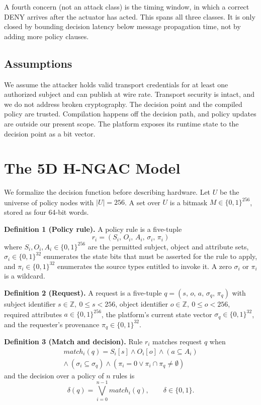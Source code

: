 \documentclass[conference]{IEEEtran}
\begin{document}
A fourth concern (not an attack class) is the timing window, in which a correct DENY arrives after the actuator has acted. This spans all three classes. It is only closed by bounding decision latency below message propagation time, not by adding more policy clauses. %

\subsection{Assumptions}

We assume the attacker holds valid transport credentials for at least one authorized subject and can publish at wire rate. Transport security is intact, and we do not address broken cryptography. The decision point and the compiled policy are trusted. Compilation happens off the decision path, and policy updates are outside our present scope. The platform exposes its runtime state to the decision point as a bit vector.

\section{The 5D H-NGAC Model}
\label{sec:model}

We formalize the decision function before describing hardware. Let $U$ be the universe of policy nodes with $|U| = 256$. A set over $U$ is a bitmask $M \in \{0,1\}^{256}$, stored as four 64-bit words.

\textbf{Definition 1 (Policy rule).} A policy rule is a five-tuple
\begin{equation}
r_i = (S_i,\, O_i,\, A_i,\, \sigma_i,\, \pi_i)
\label{eq:rule}
\end{equation}
where $S_i, O_i, A_i \in \{0,1\}^{256}$ are the permitted subject, object and attribute sets, $\sigma_i \in \{0,1\}^{32}$ enumerates the state bits that must be asserted for the rule to apply, and $\pi_i \in \{0,1\}^{32}$ enumerates the source types entitled to invoke it. A zero $\sigma_i$ or $\pi_i$ is a wildcard.

\textbf{Definition 2 (Request).} A request is a five-tuple $q = (s,\, o,\, a,\, \sigma_q,\, \pi_q)$ with subject identifier $s \in \mathbb{Z},\ 0 \le s < 256$, object identifier $o \in \mathbb{Z},\ 0 \le o < 256$, required attributes $a \in \{0,1\}^{256}$, the platform's current state vector $\sigma_q \in \{0,1\}^{32}$, and the requester's provenance $\pi_q \in \{0,1\}^{32}$.

\textbf{Definition 3 (Match and decision).} Rule $r_i$ matches request $q$ when
\begin{equation}
\begin{split}
\mathit{match}_i(q) = S_i[s] \wedge O_i[o] \wedge (a \subseteq A_i) \\
\wedge\ (\sigma_i \subseteq \sigma_q) \wedge (\pi_i = 0 \vee \pi_i \cap \pi_q \neq \emptyset)
\end{split}
\label{eq:match}
\end{equation}
and the decision over a policy of $n$ rules is
\begin{equation}
\delta(q) = \bigvee_{i=0}^{n-1} \mathit{match}_i(q), \qquad \delta \in \{0,1\}.
\label{eq:decision}
\end{equation}
\end{document}
